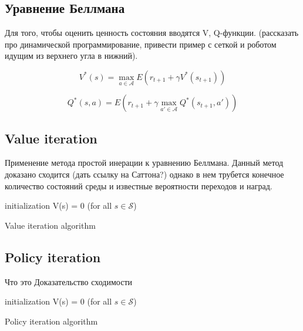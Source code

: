 \subsection{Уравнение Беллмана}

Для того, чтобы оценить ценность состояния вводятся V, Q-функции. (рассказать про динамической программирование, привести пример с сеткой и роботом идущим из верхнего угла в нижний). 

\begin{equation}
	V^*(s) = \max_{a \in \mathcal{A}} E(r_{t + 1} + \gamma V^*(s_{t + 1}))
\end{equation}

\begin{equation}
Q^*(s, a) = E(r_{t + 1} + \gamma \max_{a' \in \mathcal{A}} Q^*(s_{t + 1}, a'))
\end{equation}
 
\subsection{Value iteration}

Применение метода простой инерации к уравнению Беллмана. Данный метод доказано сходится (дать ссылку на Саттона?) однако в нем трубется конечное количество состояний среды и известные вероятности переходов и наград. 

\begin{algorithm}[H]
	\SetAlgoLined
	initialization V(s) = 0 (for all $s \in \mathcal{S}$)\;
	\caption{Value iteration algorithm}

\end{algorithm}

\subsection{Policy iteration}
Что это 
Доказательство сходимости

\begin{algorithm}[H]
	\SetAlgoLined
	initialization V(s) = 0 (for all $s \in \mathcal{S}$)\;
	\caption{Policy iteration algorithm}
\end{algorithm}


